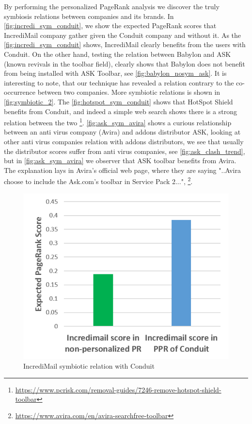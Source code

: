 \documentclass[11pt,oneside]{book}
\begin{document}
By performing the personalized PageRank analysis we discover the truly symbiosis relations between companies and its brands.
In \autoref{fig:incredi_sym_conduit}, we show the expected PageRank scores that IncrediMail company gather given the Conduit company and without it. As the \autoref{fig:incredi_sym_conduit} shows, IncrediMail clearly benefits from the users with Conduit.
On the other hand, testing the relation between Babylon and ASK (known revivals in the toolbar field), clearly shows that Babylon does not benefit from being installed with ASK Toolbar, see \autoref{fig:babylon_nosym_ask}. It is interesting to note, that our technique has revealed a relation contrary to the co-occurrence between two companies.
More symbiotic relations is shown in \autoref{fig:symbiotic_2}. The \autoref{fig:hotspot_sym_conduit} shows that HotSpot Shield benefits from Conduit, and indeed a simple web search shows there is a strong relation between the two \footnote{\url{https://www.pcrisk.com/removal-guides/7246-remove-hotspot-shield-toolbar}}. \autoref{fig:ask_sym_avira} shows a curious relationship between an anti virus company (Avira) and addons distributor ASK, looking at other anti virus companies relation with addons distributors, we see that usually the distributor scores suffer from anti virus companies, see \autoref{fig:ask_clash_trend}, but in \autoref{fig:ask_sym_avira} we observer that ASK toolbar benefits from Avira. The explanation lays in Avira's official web page, where they are saying "..Avira choose to include the Ask.com’s toolbar in Service Pack 2...", \footnote{\url{https://www.avira.com/en/avira-searchfree-toolbar}}. 


\iffalse
\begin{figure}[h]
\centering
\includegraphics[width=\linewidth]{figures/incredi_sym_conduit.png}
\caption{IncrediMail symbiotic relation with Conduit}
\label{fig:incredimail_sym_conduit}
\end{figure}
\end{document}
